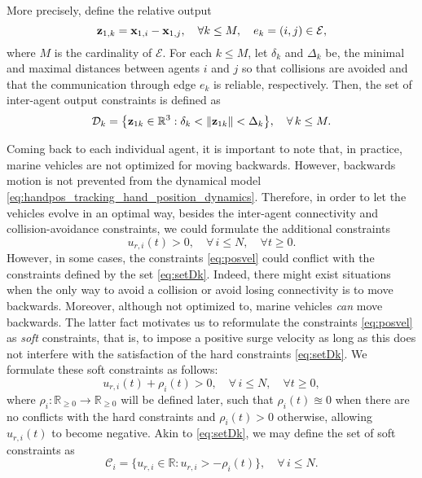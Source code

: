 More precisely, define the relative output 
\begin{equation}\label{eq:z1k-def}
    \mathbf{z}_{1, k} = \mathbf{x}_{1, i} - \mathbf{x}_{1, j}, \quad \forall k\leq M, \quad e_k=(i,j)\in\mathcal{E},
\end{equation}
where $M$ is the cardinality of $\mathcal{E}$.
For each $k\leq M$, let $\delta_k$ and ${\Delta_k}$ be, the minimal and maximal distances between agents $i$ and $j$ so that collisions are avoided and that the communication through edge $e_k$ is reliable, respectively.
Then, the set of inter-agent output constraints is defined as
\begin{equation}
\label{eq:setDk} \mathcal D_k = \big\{\mathbf{z}_{1k}\in\mathbb{R}^{3}:\delta_k<\left\|\mathbf{z}_{1k}\right\|<{\Delta_k}\big\},\quad \forall\, k\leq M.
\end{equation}

Coming back to each individual agent, it is important to note that, in practice, marine vehicles are not optimized for moving backwards. However, backwards motion is not prevented from the dynamical model \eqref{eq:handpos_tracking_hand_position_dynamics}.
Therefore, in order to let the vehicles evolve in an optimal way, besides the inter-agent connectivity and collision-avoidance constraints, we could formulate the additional constraints
\begin{equation}
\label{eq:posvel} u_{r, i}(t)> 0,\quad \forall\, i\leq N, \quad \forall t\geq 0.
\end{equation}
However, in some cases, the constraints \eqref{eq:posvel} could conflict with the constraints defined by the set \eqref{eq:setDk}. 
Indeed, there might exist situations when the only way to avoid a collision or avoid losing connectivity is to move backwards. 
Moreover, although not optimized to, marine vehicles \emph{can} move backwards.
The latter fact motivates us to reformulate the constraints \eqref{eq:posvel} as \emph{soft} constraints, that is, to impose a positive surge velocity as long as this does not interfere with the satisfaction of the hard constraints \eqref{eq:setDk}.
We formulate these soft constraints as follows:
\begin{equation}
\label{eq:soft} u_{r, i}(t) + \rho_i(t) > 0,\quad \forall\, i\leq N, \quad \forall t\geq 0,
\end{equation}
where $\rho_i:\mathbb{R}_{\geq 0}\to\mathbb{R}_{\geq 0}$ will be defined later, such that $\rho_i(t)\approxeq0$ when there are no conflicts with the hard constraints and $\rho_i(t)>0$ otherwise, allowing $u_{r, i}(t)$ to become negative. Akin to \eqref{eq:setDk}, we may define the set of soft constraints as
\begin{equation}
\label{eq:setC} \mathcal{C}_i = \big\{u_{r, i}\in\mathbb{R}:u_{r, i}>-\rho_i(t)\big\},\quad \forall\, i\leq N.
\end{equation}

